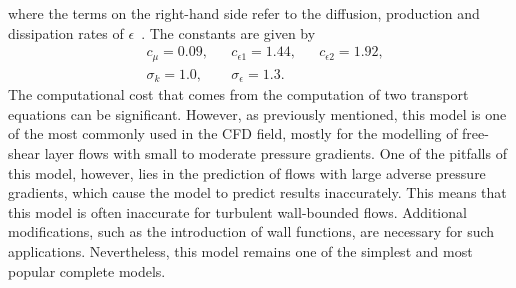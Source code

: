 where the terms on the right-hand side refer to the diffusion, production and dissipation rates of $\epsilon$~\cite{andersonComputationalFluidMechanics2016}.
The constants are given by
\begin{align}
    & c_\mu = 0.09,   & & c_{\epsilon 1} = 1.44, & & c_{\epsilon 2} = 1.92, \\
    & \sigma_k = 1.0, & & \sigma_\epsilon = 1.3.  
\end{align}
The computational cost that comes from the computation of two transport equations can be significant. However, as previously mentioned, this model is one of the most commonly used in the CFD field, mostly for the modelling of free-shear layer flows with small to moderate pressure gradients. One of the pitfalls of this model, however, lies in the prediction of flows with large adverse pressure gradients, which cause the model to predict results inaccurately. This means that this model is often inaccurate for turbulent wall-bounded flows. Additional modifications, such as the introduction of wall functions, are necessary for such applications. Nevertheless, this model remains one of the simplest and most popular complete models.
